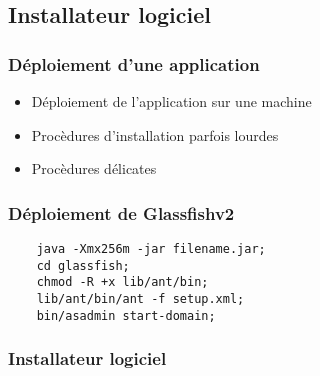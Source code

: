 \subsection{Installateur logiciel}
\begin{frame}\frametitle{Déploiement d'une application}
\begin{itemize}
 \item Déploiement de l'application sur une machine
 \item Procèdures d'installation parfois lourdes
 \item Procèdures délicates
\end{itemize}
\end{frame}
\begin{frame}\frametitle{Déploiement de Glassfishv2}
	\begin{verbatim}
	java -Xmx256m -jar filename.jar;
	cd glassfish;
	chmod -R +x lib/ant/bin;
	lib/ant/bin/ant -f setup.xml;
	bin/asadmin start-domain;
	\end{verbatim}
\end{frame}
\begin{frame}\frametitle{Installateur logiciel}
\end{frame}
